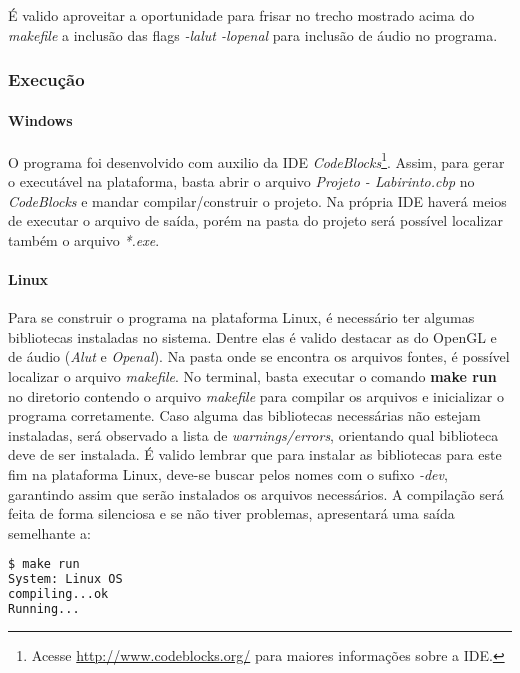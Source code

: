 É valido aproveitar a oportunidade para frisar no trecho mostrado acima do \textit{makefile} a inclusão das flags \textit{-lalut -lopenal} para inclusão de áudio no programa.


\subsubsection{Execução}\label{exe}

\paragraph{\textbf{Windows}}

O programa foi desenvolvido com auxilio da IDE \textit{CodeBlocks}\footnote{Acesse \url{http://www.codeblocks.org/} para maiores informações sobre a IDE.}. Assim, para gerar o executável na plataforma, basta abrir o arquivo \textit{Projeto - Labirinto.cbp} no \textit{CodeBlocks} e mandar compilar/construir o projeto. Na própria IDE haverá meios de executar o arquivo de saída, porém na pasta do projeto será possível localizar também o arquivo \textit{*.exe}.

\paragraph{\textbf{Linux}}

Para se construir o programa na plataforma Linux, é necessário ter algumas bibliotecas instaladas no sistema. Dentre elas é valido destacar as do OpenGL e de áudio (\textit{Alut} e \textit{Openal}). Na pasta onde se encontra os arquivos fontes, é possível localizar o arquivo \textit{makefile}. No terminal, basta executar o comando \textbf{make run} no diretorio contendo o arquivo \textit{makefile} para compilar os arquivos e inicializar o programa corretamente. Caso alguma das bibliotecas necessárias não estejam instaladas, será observado a lista de \textit{warnings/errors}, orientando qual biblioteca deve de ser instalada. É valido lembrar que para instalar as bibliotecas para este fim na plataforma Linux, deve-se buscar pelos nomes com o sufixo \textit{-dev}, garantindo assim que serão instalados os arquivos necessários. A compilação será feita de forma silenciosa e se não tiver problemas, apresentará uma saída semelhante a:

\begin{lstlisting}[language=bash,title=\textit{Saída do terminal - Linux},numbers=none]
$ make run
System: Linux OS
compiling...ok
Running...
\end{lstlisting}

